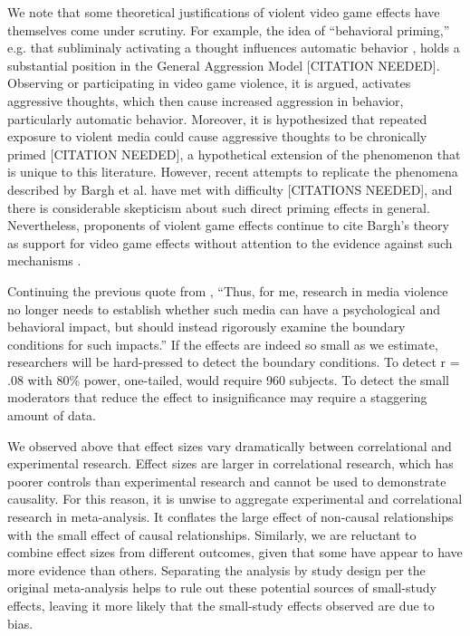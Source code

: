 \documentclass[man]{apa6}
\begin{document}
We note that some theoretical justifications of violent video game effects have themselves come under scrutiny. For example, the idea of ``behavioral priming,'' e.g. that subliminaly activating a thought influences automatic behavior \citep{Bargh:etal:1996}, holds a substantial position in the General Aggression Model [CITATION NEEDED]. Observing or participating in video game violence, it is argued, activates aggressive thoughts, which then cause increased aggression in behavior, particularly automatic behavior. Moreover, it is hypothesized that repeated exposure to violent media could cause aggressive thoughts to be chronically primed [CITATION NEEDED], a hypothetical extension of the phenomenon that is unique to this literature. However, recent attempts to replicate the phenomena described by Bargh et al. have met with difficulty [CITATIONS NEEDED], and there is considerable skepticism about such direct priming effects in general. Nevertheless, proponents of violent game effects continue to cite Bargh's theory as support for video game effects without attention to the evidence against such mechanisms \citep{Prot:Anderson:2013,Anderson:etal:2015}. %

Continuing the previous quote from \citet[p. 62]{Warburton:2014}, %
``Thus, for me, research in media violence no longer needs to establish whether such media can have a psychological and behavioral impact, but should instead rigorously examine the boundary conditions for such impacts.'' If the effects are indeed so small as we estimate, researchers will be hard-pressed to detect the boundary conditions. To detect r = .08 with 80\% power, one-tailed, would require 960 subjects. To detect the small moderators that reduce the effect to insignificance may require a staggering amount of data.

We observed above that effect sizes vary dramatically between correlational and experimental research. Effect sizes are larger in correlational research, which has poorer controls than experimental research and cannot be used to demonstrate causality. For this reason, it is unwise to aggregate experimental and correlational research in meta-analysis. It conflates the large effect of non-causal relationships with the small effect of causal relationships. Similarly, we are reluctant to combine effect sizes from different outcomes, given that some have appear to have more evidence than others. Separating the analysis by study design per the original \citet{Anderson:etal:2010} meta-analysis helps to rule out these potential sources of small-study effects, leaving it more likely that the small-study effects observed are due to bias. %
\end{document}

